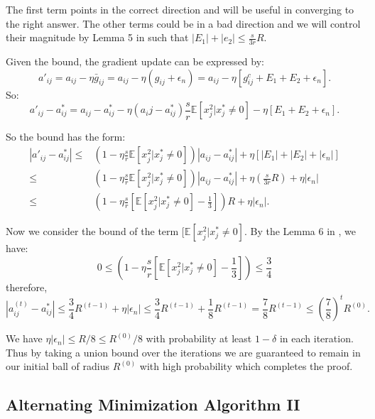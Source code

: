 The first term points in the correct direction and will be useful in converging to the right answer. The other terms could be in a bad direction and we will control their
magnitude by Lemma 5 in \cite{chatterji2017alternating} such that $|E_1|+|e_2|\leq\frac s {3r}R$.

Given the bound, the gradient update can be expressed by:
\begin{equation}
    a'_{ij}=a_{ij}-\eta\bar g_{ij} = a_{ij}-\eta(g_{ij}+\epsilon_n)=a_{ij}-\eta[g_{ij}^c+E_1+E_2+\epsilon_n].
\end{equation}
So:
\begin{equation}
    a'_{ij}-a^*_{ij}=a_{ij}-a^*_{ij}-\eta(a_ij-a^*_{ij})\frac s r \mathbb E[x_j^2|x_j^*\neq0]-\eta[E_1+E_2+\epsilon_n].
\end{equation}

So the bound has the form:
\begin{equation}
\begin{aligned}
|a'_{ij}-a^*_{ij}|\leq&\left(1-\eta\frac s r \mathbb E[x_j^2|x_j^*\neq0]\right)|a_{ij}-a^*_{ij}|+\eta[|E_1|+|E_2|+|\epsilon_n|]\\
\leq&\left(1-\eta\frac s r\mathbb E[x_j^2|x_j^*\neq 0]\right)|a_{ij}-a_{ij}^*|+\eta\left(\frac s {3r} R\right)+\eta|\epsilon_n|\\
\leq&\left(1-\eta\frac s r\left[\mathbb E[x_j^2|x_j^*\neq0]-\frac 1 3\right]\right)R+\eta|\epsilon_n|.
\end{aligned}
\end{equation}

Now we consider the bound of the term $[\mathbb E[x_j^2|x_j^*\neq0]$. By the Lemma 6 in \cite{chatterji2017alternating}, we have:
\begin{equation}
    0\leq\left(1-\eta\frac s r\left[\mathbb E[x_j^2|x_j^*\neq0]-\frac 1 3\right]\right)\leq\frac 3 4
\end{equation}
therefore,
\begin{equation}
|a_{ij}^{(t)}-a_{ij}^*|\leq\frac3 4 R^{(t-1)}+\eta|\epsilon_n|\leq\frac3 4 R^{(t-1)}+\frac1 8 R^{(t-1)}=\frac 7 8R^{(t-1)}\leq\left(\frac 7 8\right)^tR^{(0)}.
\end{equation}

We have $\eta|\epsilon_n|\leq R/8\leq R^{(0)}/8$ with probability at least $1-\delta$ in each iteration. Thus by taking a union bound over the iterations we are guaranteed to remain in our initial ball of radius $R^{(0)}$ with high probability which completes the proof.

\subsection{Alternating Minimization Algorithm II}

